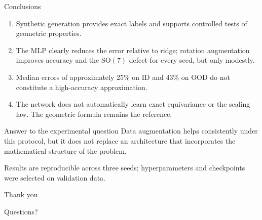 \documentclass[aspectratio=169,11pt]{beamer}
\newcommand{\SO}{\mathrm{SO}}
\begin{document}
\begin{frame}{Conclusions}
    \begin{enumerate}
        \item Synthetic generation provides exact labels and supports controlled tests of geometric properties.
        \item The MLP clearly reduces the error relative to ridge; rotation augmentation improves accuracy and the $\SO(7)$ defect for every seed, but only modestly.
        \item Median errors of approximately 25\% on ID and 43\% on OOD do not constitute a high-accuracy approximation.
        \item The network does not automatically learn exact equivariance or the scaling law. The geometric formula remains the reference.
    \end{enumerate}

    \begin{alertblock}{Answer to the experimental question}
        Data augmentation helps consistently under this protocol, but it does not replace
        an architecture that incorporates the mathematical structure of the problem.
    \end{alertblock}

    \vfill
    {\tiny Results are reproducible across three seeds; hyperparameters and checkpoints were selected on validation data.}
\end{frame}

\begin{frame}[noframenumbering]
    \centering
    \Huge Thank you

    \vspace{0.8cm}
    \Large Questions?
\end{frame}
\end{document}
